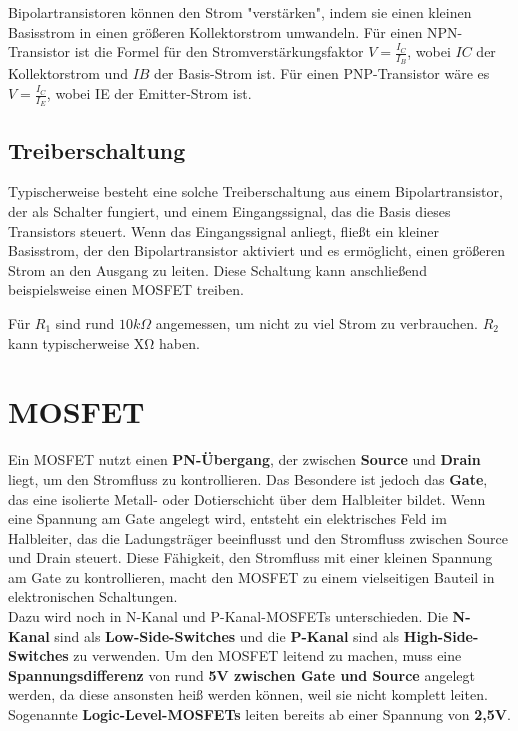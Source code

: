 Bipolartransistoren können den Strom "verstärken", indem sie einen kleinen Basisstrom in einen größeren Kollektorstrom umwandeln. Für einen NPN-Transistor ist die Formel für den Stromverstärkungsfaktor $V = \frac{I_C}{I_B}$, wobei $IC$ der Kollektorstrom und $IB$ der Basis-Strom ist. Für einen PNP-Transistor wäre es $V = \frac{I_C}{I_E}$, wobei {IE} der Emitter-Strom ist.

\subsection{Treiberschaltung}
Typischerweise besteht eine solche Treiberschaltung aus einem Bipolartransistor, der als Schalter fungiert, und einem Eingangssignal, das die Basis dieses Transistors steuert. Wenn das Eingangssignal anliegt, fließt ein kleiner Basisstrom, der den Bipolartransistor aktiviert und es ermöglicht, einen größeren Strom an den Ausgang zu leiten. Diese Schaltung kann anschließend beispielsweise einen MOSFET treiben.

Für $R_1$ sind rund $10k\Omega$ angemessen, um nicht zu viel Strom zu verbrauchen. $R_2$ kann typischerweise XΩ haben.

\section{MOSFET}
Ein MOSFET nutzt einen \textbf{PN-Übergang}, der zwischen \textbf{Source} und \textbf{Drain} liegt, um den Stromfluss zu kontrollieren. Das Besondere ist jedoch das \textbf{Gate}, das eine isolierte Metall- oder Dotierschicht über dem Halbleiter bildet. Wenn eine Spannung am Gate angelegt wird, entsteht ein elektrisches Feld im Halbleiter, das die Ladungsträger beeinflusst und den Stromfluss zwischen Source und Drain steuert. Diese Fähigkeit, den Stromfluss mit einer kleinen Spannung am Gate zu kontrollieren, macht den MOSFET zu einem vielseitigen Bauteil in elektronischen Schaltungen.\\

Dazu wird noch in N-Kanal und P-Kanal-MOSFETs unterschieden. Die \textbf{N-Kanal} sind als \textbf{Low-Side-Switches} und die \textbf{P-Kanal} sind als \textbf{High-Side-Switches} zu verwenden. Um den MOSFET leitend zu machen, muss eine \textbf{Spannungsdifferenz} von rund \textbf{5V zwischen Gate und Source} angelegt werden, da diese ansonsten heiß werden können, weil sie nicht komplett leiten. Sogenannte \textbf{Logic-Level-MOSFETs} leiten bereits ab einer Spannung von \textbf{2,5V}.
